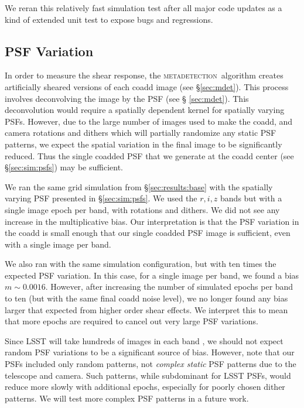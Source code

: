 \documentclass[twocolumn,twocolappendix,astrosym]{openjournal}
\newcommand{\mdet}{\textsc{metadetection}}
\begin{document}
We reran this relatively fast simulation test after all major code updates as a
kind of extended unit test to expose bugs and regressions.

\subsection{PSF Variation} \label{sec:results:psfvar}

In order to measure the shear response, the \mdet\ algorithm creates
artificially sheared versions of each coadd image (see \S \ref{sec:mdet}).
This process involves deconvolving the image by the PSF (see \S
\ref{sec:mdet}).  This deconvolution would require a spatially dependent kernel
for spatially varying PSFs.  However, due to the large number of images used to
make the coadd, and camera rotations and dithers which will partially randomize
any static PSF patterns, we expect the spatial variation in the final image
to be significantly reduced.  Thus the single coadded PSF that we generate at
the coadd center (see \S \ref{sec:sim:psfs}) may be sufficient.

We ran the same grid simulation from \S \ref{sec:results:base} with the
spatially varying PSF presented in \S \ref{sec:sim:psfs}. We used the $r, i, z$
bands but with a single image epoch per band, with rotations and dithers.  We
did not see any increase in the multiplicative bias.   Our interpretation is
that the PSF variation in the coadd is small enough that our single coadded PSF
image is sufficient, even with a single image per band.

We also ran with the same simulation configuration, but with ten times the
expected PSF variation. In this case, for a single image per band, we found a
bias $m \sim 0.0016$.  However, after increasing the number of simulated epochs
per band to ten (but with the same final coadd noise level), we no longer found
any bias larger that expected from higher order shear effects.  We interpret
this to mean that more epochs are required to cancel out very large PSF
variations.

Since LSST will take hundreds of images in each band \citep{IvezicLSST2008}, we
should not expect random PSF variations to be a significant source of bias.
However, note that our PSFs included only random patterns, not {\em complex
static} PSF patterns due to the telescope and camera. Such patterns, while
subdominant for LSST PSFs, would reduce more slowly with additional epochs,
especially for poorly chosen dither patterns. We will test more complex PSF
patterns in a future work.
\end{document}
